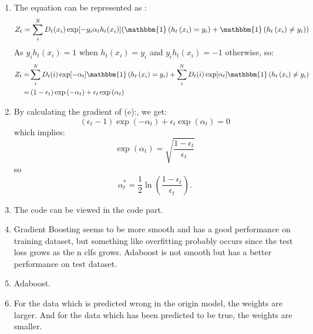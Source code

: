 \documentclass[
	12pt, %
]{fphw}
\begin{document}
\begin{enumerate}
	\item The equation can be represented as :
	\begin{equation*}
		Z_t = \sum_{i}^{N} D_t(x_i) \exp [-y_i \alpha_t h_t(x_i)](\mathbbm{1}\left(h_t\left(x_i\right) = y_i\right)+\mathbbm{1}\left(h_t\left(x_i\right) \neq y_i\right))
	\end{equation*}
	As $y_i h_t(x_i) =1 $ when $h_t\left(x_i\right) = y_i$ and $y_i h_t(x_i) =-1 $ otherwise, so:
	\begin{align*}
		Z_t = &\sum_{i}^N D_t(i) \exp [-\alpha_t] \mathbbm{1}\left(h_t\left(x_i\right) = y_i\right) + \sum_{i}^N D_t(i) \exp [\alpha_t] \mathbbm{1}\left(h_t\left(x_i\right) \neq y_i\right)\\
			= &\left(1-\epsilon_t\right) \exp \left(-\alpha_t\right)+\epsilon_t \exp \left(\alpha_t\right)
	\end{align*}
	

	\item By calculating the gradient of (e):, we get:
	\begin{equation*}
		\left(\epsilon_t-1\right) \exp \left(-\alpha_t\right)+\epsilon_t \exp \left(\alpha_t\right) = 0
	\end{equation*}
	which implies: 
	\begin{equation*}
		\exp \left(\alpha_t\right) = \sqrt{\frac{1-\epsilon_t}{\epsilon_t}} 
	\end{equation*}
	so $$
	\alpha_t^*=\frac{1}{2} \ln \left(\frac{1-\epsilon_t}{\epsilon_t}\right).
	$$
	\item The code can be viewed in the code part.
	\item Gradient Boosting seems to be more smooth and has a good performance on training dataset, but something like overfitting probably occurs since the test loss grows as the n clfs grows.
	Adaboost is not smooth but has a better performance on test dataset.
	\item Adaboost. 
	\item For the data which is predicted wrong in the origin model, the weights are larger. And for the data which has been predicted to be true, the weights are smaller.
	

\end{enumerate}
\end{document}
